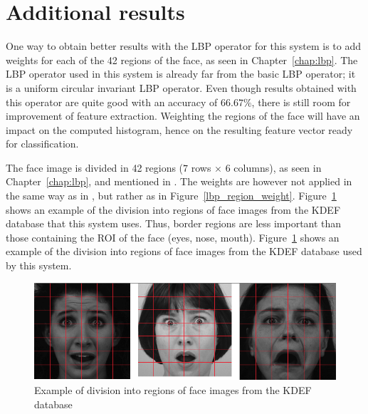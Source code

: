 \section{Additional results}

\vspace{\baselineskip}
\noindent One way to obtain better results with the LBP operator for this system is to add weights for each of the 42 regions of the face, as seen in Chapter~\ref{chap:lbp}. The LBP operator used in this system is already far from the basic LBP operator; it is a uniform circular invariant LBP operator. Even though results obtained with this operator are quite good with an accuracy of $ 66.67\% $, there is still room for improvement of feature extraction. Weighting the regions of the face will have an impact on the computed histogram, hence on the resulting feature vector ready for classification. \newline

\noindent The face image is divided in 42 regions ($ 7 $ rows $\times$ $ 6 $ columns), as seen in Chapter~\ref{chap:lbp}, and mentioned in \cite{GAN08}. The weights are however not applied in the same way as in \cite{GAN08}, but rather as in Figure~\ref{lbp_region_weight}. Figure~\ref{implementation_weight_example} shows an example of the division into regions of face images from the KDEF database that this system uses. Thus, border regions are less important than those containing the ROI of the face (eyes, nose, mouth). Figure~\ref{implementation_weight_example} shows an example of the division into regions of face images from the KDEF database used by this system.
\newline

\begin{figure}[!h]
\begin{center}
\noindent \includegraphics[scale=0.4]{figures/implementation_weight_example} 
\newline
\caption{Example of division into regions of face images from the KDEF database}
\label{implementation_weight_example}
\end{center} 
\end{figure}

